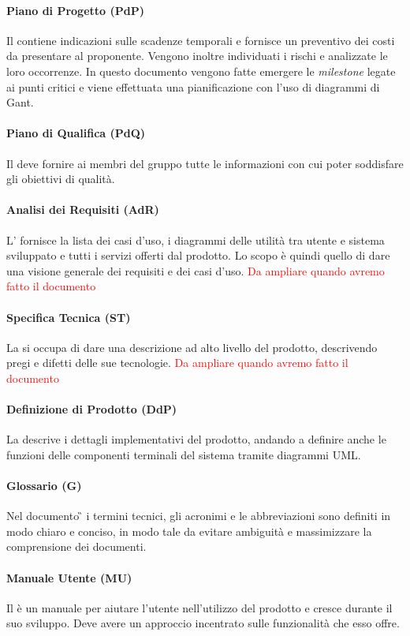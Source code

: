 \paragraph{Piano di Progetto (PdP)}
Il \PdP{} contiene indicazioni sulle scadenze temporali e fornisce un preventivo dei costi da presentare al proponente.
 Vengono inoltre individuati i rischi e analizzate le loro occorrenze.
In questo documento vengono fatte emergere le \emph{milestone} legate ai punti critici e viene effettuata una pianificazione con l'uso di diagrammi di Gant.
\paragraph{Piano di Qualifica (PdQ)} 
Il \PdQ{} deve fornire ai membri del gruppo tutte le informazioni con cui poter soddisfare gli obiettivi di qualità.
\paragraph{Analisi dei Requisiti (AdR)}
L'\AdR{} fornisce la lista dei casi d'uso, i diagrammi delle utilità tra utente e sistema sviluppato e tutti i servizi offerti dal prodotto. Lo scopo è quindi quello di dare una visione generale dei requisiti e dei casi d'uso. \textcolor{red}{Da ampliare quando avremo fatto il documento}
\paragraph{Specifica Tecnica (ST)}
La \SP{} si occupa di dare una descrizione ad alto livello del prodotto, descrivendo pregi e difetti delle sue tecnologie. \textcolor{red}{Da ampliare quando avremo fatto il documento}
\paragraph{Definizione di Prodotto (DdP)}
La \DdP{} descrive i dettagli implementativi del prodotto, andando a definire anche le funzioni delle componenti terminali del sistema tramite diagrammi UML.
\paragraph{Glossario (G)}
Nel documento \G{} i termini tecnici, gli acronimi e le abbreviazioni sono definiti in modo chiaro e conciso, in modo tale da evitare ambiguità e massimizzare la comprensione dei documenti.
\paragraph{Manuale Utente (MU)}
Il \MU{} è un manuale per aiutare l'utente nell'utilizzo del prodotto e cresce durante il suo sviluppo. Deve avere un approccio incentrato sulle funzionalità che esso offre.
